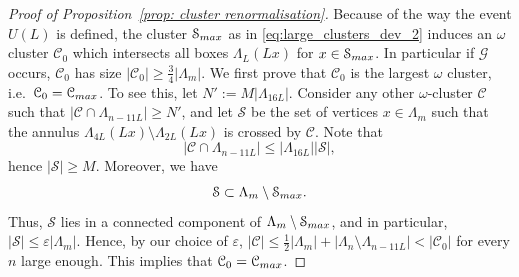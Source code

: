\documentclass[11pt,a4paper]{article}
\theoremstyle{definition}
\numberwithin{equation}{section}
\begin{document}
\begin{proof}[Proof of Proposition~\textup{\ref{prop: cluster renormalisation}}]
Because of the way the event $U(L)$ is defined, the cluster $\mathcal{S}_{\rm max}$ as in \eqref{eq:large_clusters_dev_2} induces an $\omega$ cluster $\mathcal{C}_0$ which intersects all boxes $\Lambda_L(Lx)$ for $x\in \mathcal{S}_{\rm max}$. In particular if $\mathcal{G}$ occurs, $\mathcal{C}_0$ has size $|\mathcal{C}_0|\geq \frac{3}{4}|\Lambda_m|$. We first prove that $\mathcal{C}_0$ is the largest $\omega$ cluster, i.e.\ $\mathcal{C}_0=\mathcal{C}_{\rm max}$. To see this, let $N':=M|\Lambda_{16L}|$. Consider any other $\omega$-cluster $\mathcal{C}$ such that $|\mathcal{C}\cap \Lambda_{n-11L}|\geq N'$, and let $\mathcal{S}$ be the set of vertices $x\in \Lambda_m$ such that the annulus $\Lambda_{4L}(Lx)\setminus\Lambda_{2L}(Lx)$ is crossed by $\mathcal{C}$. Note that 
\begin{equation}\label{eq: simple inequality}
|\mathcal{C}\cap \Lambda_{n-11L}|\leq |\Lambda_{16L}||\mathcal{S}|,
\end{equation}
hence $|\mathcal{S}|\geq M$. Moreover, we have 
\begin{equation}\label{eq: simple inequality 2}
\mathcal{S}\subset \Lambda_m\setminus \mathcal{S}_{\rm max}.
\end{equation}
Thus, $\mathcal{S}$ lies in a connected component of $\Lambda_m\setminus \mathcal{S}_{\rm max}$, and in particular, $|\mathcal{S}|\leq \varepsilon |\Lambda_m|$. Hence, by our choice of $\varepsilon$, $|\mathcal{C}|\leq \frac{1}{2} |\Lambda_m|+|\Lambda_{n}\setminus\Lambda_{n-11L}|<|\mathcal{C}_0|$ for every $n$ large enough. This implies that $\mathcal{C}_0=\mathcal{C}_{\rm max}$. 


\end{proof}
\end{document}
